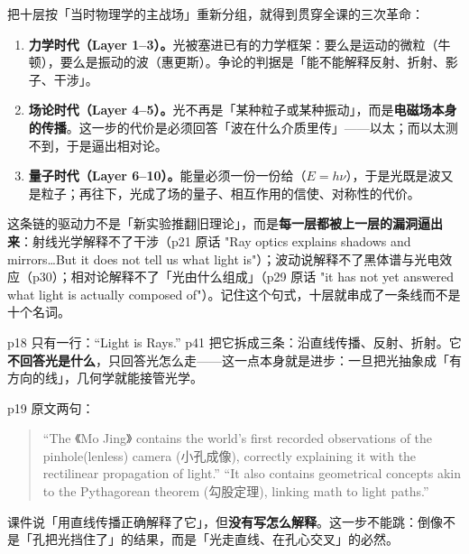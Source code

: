\documentclass[11pt]{ctexart}
\newcommand{\cpage}[1]{\textsf{p#1}}
\begin{document}

把十层按「当时物理学的主战场」重新分组，就得到贯穿全课的三次革命：

\begin{enumerate}
\item \textbf{力学时代（Layer 1--3）。}光被塞进已有的力学框架：要么是运动的微粒（牛顿），要么是振动的波（惠更斯）。争论的判据是「能不能解释反射、折射、影子、干涉」。
\item \textbf{场论时代（Layer 4--5）。}光不再是「某种粒子或某种振动」，而是\textbf{电磁场本身的传播}。这一步的代价是必须回答「波在什么介质里传」——以太；而以太测不到，于是逼出相对论。
\item \textbf{量子时代（Layer 6--10）。}能量必须一份一份给（$E=h\nu$），于是光既是波又是粒子；再往下，光成了场的量子、相互作用的信使、对称性的代价。
\end{enumerate}

这条链的驱动力不是「新实验推翻旧理论」，而是\textbf{每一层都被上一层的漏洞逼出来}：射线光学解释不了干涉（\cpage{21} 原话 "Ray optics explains shadows and mirrors\ldots But it does not tell us what light is"）；波动说解释不了黑体谱与光电效应（\cpage{30}）；相对论解释不了「光由什么组成」（\cpage{29} 原话 "it has not yet answered what light is actually composed of"）。记住这个句式，十层就串成了一条线而不是十个名词。



\cpage{18} 只有一行：``Light is Rays.'' \cpage{41} 把它拆成三条：沿直线传播、反射、折射。它\textbf{不回答光是什么}，只回答光怎么走——这一点本身就是进步：一旦把光抽象成「有方向的线」，几何学就能接管光学。


\cpage{19} 原文两句：

\begin{quote}
``The 《Mo Jing》 contains the world's first recorded observations of the pinhole(lenless) camera (小孔成像), correctly explaining it with the rectilinear propagation of light.''
``It also contains geometrical concepts akin to the Pythagorean theorem (勾股定理), linking math to light paths.''
\end{quote}

课件说「用直线传播正确解释了它」，但\textbf{没有写怎么解释}。这一步不能跳：倒像不是「孔把光挡住了」的结果，而是「光走直线、在孔心交叉」的必然。
\end{document}
